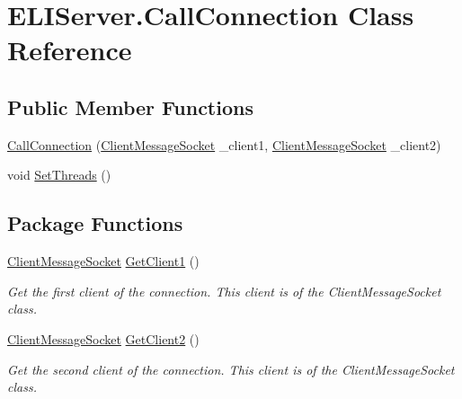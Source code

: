 \hypertarget{class_e_l_i_server_1_1_call_connection}{}\section{E\+L\+I\+Server.\+Call\+Connection Class Reference}
\label{class_e_l_i_server_1_1_call_connection}


 


\subsection*{Public Member Functions}
\begin{DoxyCompactItemize}
\item 
\hyperlink{class_e_l_i_server_1_1_call_connection_ad0182673abc1aaffa6f4f539a727f782}{Call\+Connection} (\hyperlink{class_e_l_i_server_1_1_messaging_1_1_client_message_socket}{Client\+Message\+Socket} \+\_\+client1, \hyperlink{class_e_l_i_server_1_1_messaging_1_1_client_message_socket}{Client\+Message\+Socket} \+\_\+client2)
\item 
void \hyperlink{class_e_l_i_server_1_1_call_connection_ac9a3d9918d1739e322cc9a4a6fdcbeeb}{Set\+Threads} ()
\end{DoxyCompactItemize}
\subsection*{Package Functions}
\begin{DoxyCompactItemize}
\item 
\hyperlink{class_e_l_i_server_1_1_messaging_1_1_client_message_socket}{Client\+Message\+Socket} \hyperlink{class_e_l_i_server_1_1_call_connection_ae65d1e69b626abc7d354ca87ab800b12}{Get\+Client1} ()
\begin{DoxyCompactList}\small\item\em Get the first client of the connection. This client is of the Client\+Message\+Socket class. \end{DoxyCompactList}\item 
\hyperlink{class_e_l_i_server_1_1_messaging_1_1_client_message_socket}{Client\+Message\+Socket} \hyperlink{class_e_l_i_server_1_1_call_connection_ad424584ee59e02e9a3ac7b1993694683}{Get\+Client2} ()
\begin{DoxyCompactList}\small\item\em Get the second client of the connection. This client is of the Client\+Message\+Socket class. \end{DoxyCompactList}\end{DoxyCompactItemize}
